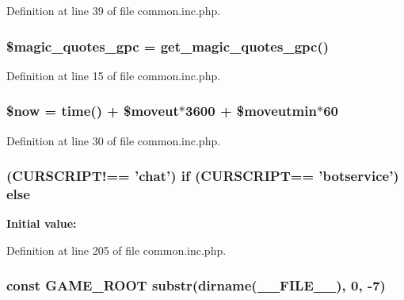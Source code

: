 Definition at line 39 of file common.\+inc.\+php.

\hypertarget{common_8inc_8php_a3bf6a6f8faa278d5cceb69655ecdb782}{
\subsubsection[{\$magic\+\_\+quotes\+\_\+gpc}]{\setlength{\rightskip}{0pt plus 5cm}\$magic\+\_\+quotes\+\_\+gpc = get\+\_\+magic\+\_\+quotes\+\_\+gpc()}}\label{common_8inc_8php_a3bf6a6f8faa278d5cceb69655ecdb782}


Definition at line 15 of file common.\+inc.\+php.

\hypertarget{common_8inc_8php_af1d5ccdee975b8f4d20aaffc5b28557c}{
\subsubsection[{\$now}]{\setlength{\rightskip}{0pt plus 5cm}\$now = time() + \$moveut$\ast$3600 + \$moveutmin$\ast$60}}\label{common_8inc_8php_af1d5ccdee975b8f4d20aaffc5b28557c}


Definition at line 30 of file common.\+inc.\+php.

\hypertarget{common_8inc_8php_aa917bbe088c28b1850023f42d190b240}{
\subsubsection[{else}]{ (C\+U\+R\+S\+C\+R\+I\+P\+T!== '{\bf chat}') {\bf if} ({\bf C\+U\+R\+S\+C\+R\+I\+P\+T}== 'botservice') else}}\label{common_8inc_8php_aa917bbe088c28b1850023f42d190b240}
{\bfseries Initial value\+:}


Definition at line 205 of file common.\+inc.\+php.

\hypertarget{common_8inc_8php_a8e43cd27c8e744fff590983bc396aba3}{
\subsubsection[{G\+A\+M\+E\+\_\+\+R\+O\+O\+T}]{\setlength{\rightskip}{0pt plus 5cm}const G\+A\+M\+E\+\_\+\+R\+O\+O\+T substr(dirname(\+\_\+\+\_\+\+F\+I\+L\+E\+\_\+\+\_\+), 0, -\/7)}}\label{common_8inc_8php_a8e43cd27c8e744fff590983bc396aba3}


